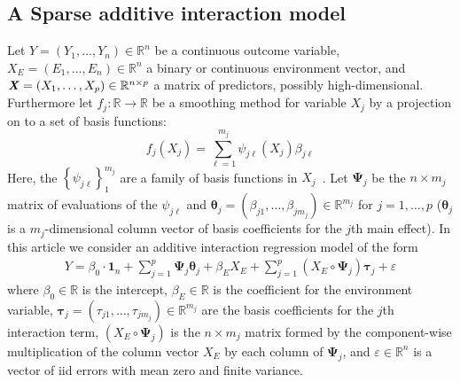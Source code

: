 \documentclass[12pt,letter]{article}\usepackage[]{graphicx}\usepackage[]{color}
\newcommand{\bX}{\textbf{\emph{X}}}
\newcommand{\btau}{\boldsymbol{\tau}}
\newcommand{\e}{{\mathsf E}}
\newcommand{\bmu}{\boldsymbol{\mu}}
\newcommand{\btheta}{\boldsymbol{\theta}}
\newcommand{\bPsi}{\boldsymbol{\Psi}}
\begin{document}
\subsection{A Sparse additive interaction model}
Let $Y=(Y_1, \ldots, Y_n) \in \mathbb{R}^n$ be a continuous outcome variable, \mbox{$X_E=(E_1, \ldots, E_n) \in \mathbb{R}^n$} a binary or continuous environment vector, and \mbox{$\bX = (X_{1}, \ldots, X_{p}) \in \mathbb{R}^{n\times p}$} a matrix of predictors, possibly high-dimensional. Furthermore let $f_j: \mathbb{R} \rightarrow \mathbb{R}$ be a smoothing method for variable $X_j$ by a projection on to a set of basis functions:
\begin{equation}
	f_j(X_j) = \sum_{\ell = 1}^{m_j} \psi_{j\ell}(X_j) \beta_{j\ell} \label{eq:smooth}
\end{equation}
Here, the $\left\lbrace \psi_{j\ell} \right\rbrace_1^{m_j}$ are a family of basis functions in $X_j$~\citep{hastie2015statistical}. Let $\bPsi_j$ be the $n \times m_j$ matrix of evaluations of the $\psi_{j\ell}$ and \mbox{$\btheta_j = (\beta_{j1}, \ldots, \beta_{jm_j}) \in \mathbb{R}^{m_j}$} for $j = 1, \ldots, p$ ($\btheta_j$ is a $m_j$-dimensional column vector of basis coefficients for the $j$th main effect). In this article we consider an additive interaction regression model of the form 
\begin{align}
Y = \beta_0 \cdot \boldsymbol{1}_n + \sum_{j=1}^p \bPsi_j \btheta_j + \beta_E X_E + \sum_{j=1}^p (X_E \circ \bPsi_j) \btau_j + \varepsilon  \label{eq:linpred}
\end{align}
where $\beta_0 \in \mathbb{R}$ is the intercept, $\beta_E \in \mathbb{R}$ is the coefficient for the environment variable, $\btau_j = (\tau_{j1}, \ldots, \tau_{jm_j})\in \mathbb{R}^{m_j}$ are the basis coefficients for the $j$th interaction term, $(X_E \circ \bPsi_j)$ is the $n \times m_j$ matrix formed by the component-wise multiplication of the column vector $X_E$ by each column of $\bPsi_j$, and $\varepsilon \in \mathbb{R}^n$ is a vector of iid errors with mean zero and finite variance. %
\end{document}
